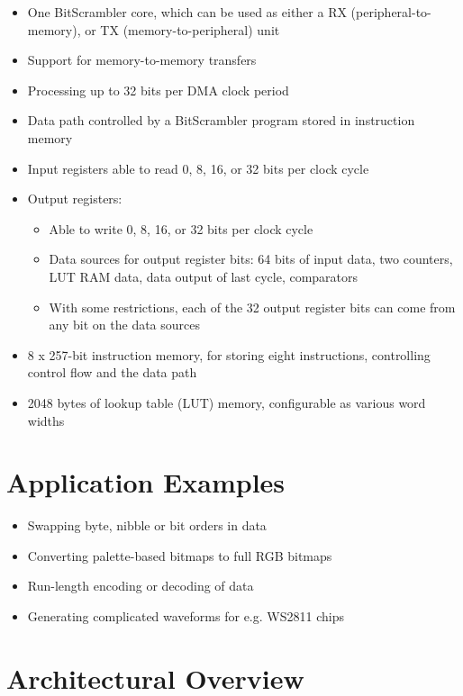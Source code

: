 \documentclass[main\_\_EN.tex]{subfiles}
\begin{document}
\begin{itemize}
    \item One BitScrambler core, which can be used as either a RX (peripheral-to-memory), or TX (memory-to-peripheral) unit
    \item Support for memory-to-memory transfers
    \item Processing up to 32 bits per DMA clock period
    \item Data path controlled by a BitScrambler program stored in instruction memory
    \item Input registers able to read 0, 8, 16, or 32 bits per clock cycle
    \item Output registers:
    \begin{itemize}
        \item Able to write 0, 8, 16, or 32 bits per clock cycle
        \item Data sources for output register bits: 64 bits of input data, two counters, LUT RAM data, data output of last cycle, comparators
        \item With some restrictions, each of the 32 output register bits can come from any bit on the data sources
    \end{itemize}
    \item 8 x 257-bit instruction memory, for storing eight instructions, controlling control flow and the data path
    \item 2048 bytes of lookup table (LUT) memory, configurable as various word widths
\end{itemize}

\section{Application Examples}
\label{sec:bitscrm-app-examples}

\begin{itemize}
    \item Swapping byte, nibble or bit orders in data
    \item Converting palette-based bitmaps to full RGB bitmaps
    \item Run-length encoding or decoding of data
    \item Generating complicated waveforms for e.g. WS2811 chips
\end{itemize}



\section{Architectural Overview}
\label{sec:bitscrm-arch-overview}
\end{document}
